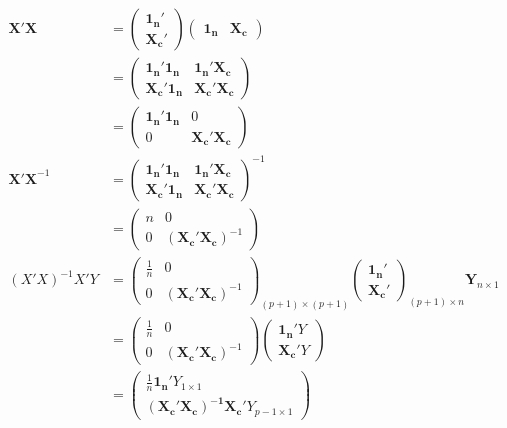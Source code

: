 \documentclass[a4paper]{article}
\begin{document}
\begin{align*}
\mathbf{X'X} &= \begin{pmatrix}
\mathbf{1_n}'\\
\mathbf{X_c}'
\end{pmatrix} \begin{pmatrix}
\mathbf{1_n} & \mathbf{X_c}
\end{pmatrix}\\
&= \begin{pmatrix}
\mathbf{1_n}' \mathbf{1_n} & \mathbf{1_n'X_c}\\
\mathbf{X_c'1_n} & \mathbf{X_c'X_c}
\end{pmatrix}\\
&= \begin{pmatrix}
\mathbf{1_n}' \mathbf{1_n} & 0\\
0 & \mathbf{X_c'X_c}
\end{pmatrix}\\
\mathbf{X'X}^{-1} &= \begin{pmatrix}
\mathbf{1_n}' \mathbf{1_n} & \mathbf{1_n'X_c}\\
\mathbf{X_c'1_n} & \mathbf{X_c'X_c}
\end{pmatrix}^{-1}\\
&= \begin{pmatrix}
n & 0\\
0 & (\mathbf{X_c'X_c})^{-1}
\end{pmatrix}\\
(X'X)^{-1}X'Y &= \begin{pmatrix}
\frac{1}{n} & 0\\
0 & (\mathbf{X_c'X_c})^{-1}
\end{pmatrix}_{(p+1) \times (p+1)}\begin{pmatrix}
\mathbf{1_n}'\\
\mathbf{X_c}'
\end{pmatrix}_{(p+1) \times n}\mathbf{Y}_{n \times 1}\\
&= \begin{pmatrix}
\frac{1}{n} & 0\\
0 & (\mathbf{X_c'X_c})^{-1}
\end{pmatrix}\begin{pmatrix}
\mathbf{1_n}'Y\\
\mathbf{X_c}'Y
\end{pmatrix}\\
&= \begin{pmatrix}
\frac{1}{n}\mathbf{1_n}'Y_{1 \times 1}\\
\mathbf{(X_c'X_c)^{-1}X_c}'Y_{p-1 \times 1}
\end{pmatrix}\\

\end{align*}
\end{document}
